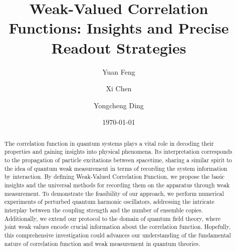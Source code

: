 \documentclass[twocolumn,pra,aps,superscriptaddress]{revtex4-2}
\begin{document}
\title{Weak-Valued Correlation Functions: Insights and Precise Readout Strategies}

\author{Yuan Feng}

\author{Xi Chen}

\author{Yongcheng Ding}

\date{\today}

\begin{abstract}	
	
{ The correlation function in quantum systems plays a vital role in decoding their properties and gaining insights into physical phenomena. Its interpretation corresponds to the propagation of particle excitations between spacetime, sharing a similar spirit to the idea of quantum weak measurement in terms of recording the system information by interaction. By defining Weak-Valued Correlation Function, we propose the basic insights and the universal methods for recording them on the apparatus through weak measurement. To demonstrate the feasibility of our approach, we perform numerical experiments of perturbed quantum harmonic oscillators, addressing the intricate interplay between the coupling strength and the number of ensemble copies. Additionally, we extend our protocol to the domain of quantum field theory, where joint weak values encode crucial information about the correlation function. Hopefully, this comprehensive investigation could advances our understanding of the fundamental nature of correlation function and weak measurement in quantum theories.}
\end{abstract}
\maketitle
\end{document}
